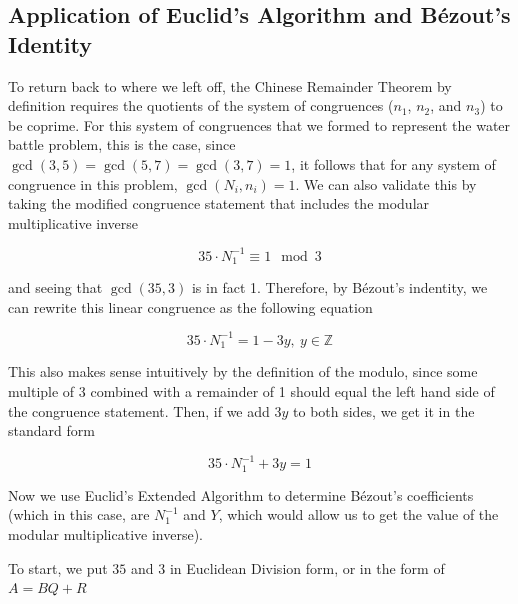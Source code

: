 \documentclass[index]{subfiles}
\begin{document}
\subsection{Application of Euclid's Algorithm and Bézout's Identity}

To return back to where we left off, the Chinese Remainder Theorem by definition requires the quotients of the system of congruences (\(n_1\), \(n_2\), and \(n_3\)) to be coprime. For this system of congruences that we formed to represent the water battle problem, this is the case, since \(\gcd(3,5)=\gcd(5,7)=\gcd(3,7)=1\), it follows that for any system of congruence in this problem, \(\gcd(N_i,n_i)=1\). We can also validate this by taking the modified congruence statement that includes the modular multiplicative inverse

\begin{equation*}
    35\cdot N_1^{-1}\equiv1\mod3
\end{equation*}

and seeing that \(\gcd(35,3)\) is in fact 1. Therefore, by Bézout's indentity, we can rewrite this linear congruence as the following equation

\begin{equation*}
    35\cdot N_1^{-1}=1-3y,\ y\in\mathbb{Z}
\end{equation*}

This also makes sense intuitively by the definition of the modulo, since some multiple of 3 combined with a remainder of 1 should equal the left hand side of the congruence statement. Then, if we add \(3y\) to both sides, we get it in the standard form

\begin{equation*}
    35\cdot N_1^{-1}+3y=1
\end{equation*}

Now we use Euclid's Extended Algorithm to determine Bézout's coefficients (which in this case, are \(N_1^{-1}\) and \(Y\), which would allow us to get the value of the modular multiplicative inverse).

To start, we put \(35\) and \(3\) in Euclidean Division form, or in the form of \(A=BQ+R\)
\end{document}
